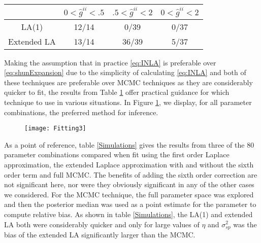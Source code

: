 \documentclass[11pt]{isuthesis}
\begin{document}
		
		\begin{table}[h]
			\begin{center}
				\begin{tabular}{ |c|c|c|c| } 
					\hline
					&$0<\hat{g}^{ii}<.5$&$ .5<\hat{g}^{ii}<2$ & $0<\hat{g}^{ii}<2$\\
					\hline
					LA(1)& 12/14 & 0/39 & 0/37\\
					Extended LA & 13/14 & 36/39 & 5/37\\
					\hline
				\end{tabular}
			\end{center}
			\label{Simulations2}
		\end{table}
	Making the assumption that in practice \eqref{eq:INLA} is preferable over \eqref{eq:shunExpansion} due to the simplicity of calculating \eqref{eq:INLA} and both of these techniques are preferable over MCMC techniques as they are considerably quicker to fit, the results from Table \ref{Simulations2} offer practical guidance for which technique to use in various situations.  In Figure \ref{fig:Fitting}, we display, for all parameter combinations, the preferred method for inference.
	
	
	\begin{figure}[!htp]
		\centering
		\texttt{[image: Fitting3]}
		\label{fig:Fitting}
	\end{figure}
	
	 As a point of reference, table \ref{Simulations} gives the results from three of the 80 parameter combinations compared when fit using the first order Laplace approximation, the extended Laplace approximation with and without the sixth order term and full MCMC. The benefits of adding the sixth order correction are not significant here, nor were they obviously significant in any of the other cases we considered.   For the MCMC technique, the full parameter space was explored and then the posterior median was used as a point estimate for the parameter to compute relative bias.  As shown in table \ref{Simulations}, the LA(1) and extended LA both were considerably quicker and only for large values of $\eta$ and $\sigma^2_{sp}$ was the bias of the extended LA significantly larger than the MCMC.
	 
\end{document}
